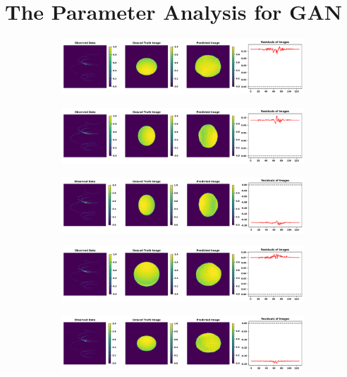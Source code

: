 \section{The Parameter Analysis for GAN}
\begin{figure}
	\centering
	\begin{subfigure}{\linewidth}
		\includegraphics[width=\linewidth]{fig/testing_image/image_0.png}
	\end{subfigure}
	\begin{subfigure}{\linewidth}
		\includegraphics[width=\linewidth]{fig/testing_image/image_16.png}
	\end{subfigure}
	\begin{subfigure}{\linewidth}
		\includegraphics[width=\linewidth]{fig/testing_image/image_35.png}
	\end{subfigure}
	\begin{subfigure}{\linewidth}
		\includegraphics[width=\linewidth]{fig/testing_image/image_38.png}
	\end{subfigure}
	\begin{subfigure}{\linewidth}
		\includegraphics[width=\linewidth]{fig/testing_image/image_42.png}

\end{subfigure}
\end{figure}
